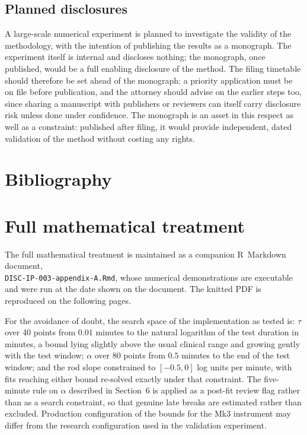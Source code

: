 \documentclass[11pt,a4paper]{article}
\begin{document}
\subsection{Planned disclosures}
A large-scale numerical experiment is planned to investigate the validity
of the methodology, with the intention of publishing the results as a
monograph. The experiment itself is internal and discloses nothing; the
monograph, once published, would be a full enabling disclosure of the
method. The filing timetable should therefore be set ahead of the
monograph: a priority application must be on file before publication, and
the attorney should advise on the earlier steps too, since sharing a
manuscript with publishers or reviewers can itself carry disclosure risk
unless done under confidence. The monograph is an asset in this respect
as well as a constraint: published after filing, it would provide
independent, dated validation of the method without costing any rights.


\section{Bibliography} 




\newpage
\appendix
\section{Full mathematical treatment}
The full mathematical treatment is maintained as a companion R~Markdown
document,\\ \texttt{DISC-IP-003-appendix-A.Rmd}, whose numerical
demonstrations are executable and were run at the date shown on the
document. The knitted PDF is reproduced on the following pages.

For the avoidance of doubt, the search space of the implementation as
tested is: $\tau$ over 40 points from $0.01$ minutes to the natural
logarithm of the test duration in minutes, a bound lying slightly above
the usual clinical range and growing gently with the test window;
$\alpha$ over 80 points from $0.5$ minutes to the end of the test window;
and the rod slope constrained to $[-0.5, 0]$ log units per minute, with
fits reaching either bound re-solved exactly under that constraint. The
five-minute rule on $\alpha$ described in Section~6 is applied as a
post-fit review flag rather than as a search constraint, so that genuine
late breaks are estimated rather than excluded. Production configuration
of the bounds for the Mk3 instrument may differ from the research
configuration used in the validation experiment.
\end{document}
